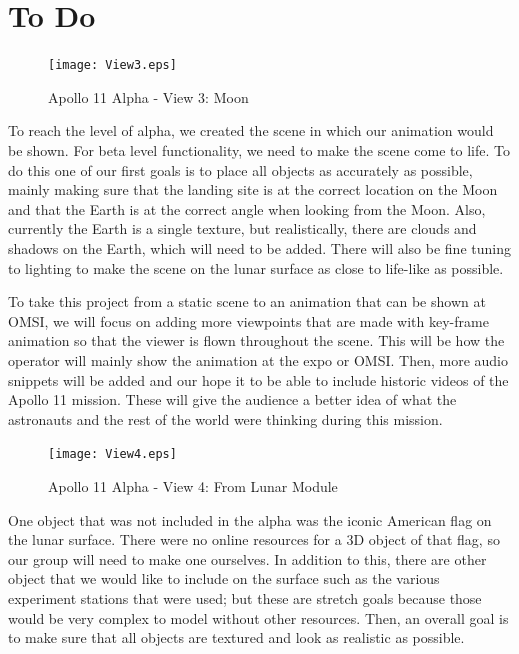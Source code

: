 \documentclass[onecolumn, draftclsnofoot,10pt, compsoc]{IEEEtran}
\begin{document}
\section{To Do}

\begin{figure}
    \texttt{[image: View3.eps]}
    \caption{Apollo 11 Alpha - View 3: Moon}
    \label{fig:View 3}
\end{figure}

To reach the level of alpha, we created the scene in which our animation would be shown. For beta level functionality, we need to make the scene come to life. To do this one of our first goals is to place all objects as accurately as possible, mainly making sure that the landing site is at the correct location on the Moon and that the Earth is at the correct angle when looking from the Moon. Also, currently the Earth is a single texture, but realistically, there are clouds and shadows on the Earth, which will need to be added. There will also be fine tuning to lighting to make the scene on the lunar surface as close to life-like as possible.

To take this project from a static scene to an animation that can be shown at OMSI, we will focus on adding more viewpoints that are made with key-frame animation so that the viewer is flown throughout the scene. This will be how the operator will mainly show the animation at the expo or OMSI. Then, more audio snippets will be added and our hope it to be able to include historic videos of the Apollo 11 mission. These will give the audience a better idea of what the astronauts and the rest of the world were thinking during this mission. 

\begin{figure}
    \texttt{[image: View4.eps]}
    \caption{Apollo 11 Alpha - View 4: From Lunar Module}
    \label{fig:View 4}
\end{figure}

One object that was not included in the alpha was the iconic American flag on the lunar surface. There were no online resources for a 3D object of that flag, so our group will need to make one ourselves. In addition to this, there are other object that we would like to include on the surface such as the various experiment stations that were used; but these are stretch goals because those would be very complex to model without other resources. Then, an overall goal is to make sure that all objects are textured and look as realistic as possible.
\end{document}
